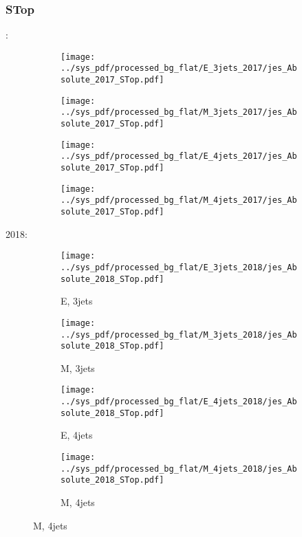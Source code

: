 \documentclass{beamer}
\begin{document}
\begin{frame}
\frametitle{STop}
\fontsize{5}{1}:
\begin{figure}
\centering
\begin{subfigure}[b]{0.24\textwidth}
\texttt{[image: ../sys\_pdf/processed\_bg\_flat/E\_3jets\_2017/jes\_Absolute\_2017\_STop.pdf]}
\end{subfigure}
\begin{subfigure}[b]{0.24\textwidth}
\texttt{[image: ../sys\_pdf/processed\_bg\_flat/M\_3jets\_2017/jes\_Absolute\_2017\_STop.pdf]}
\end{subfigure}
\begin{subfigure}[b]{0.24\textwidth}
\texttt{[image: ../sys\_pdf/processed\_bg\_flat/E\_4jets\_2017/jes\_Absolute\_2017\_STop.pdf]}
\end{subfigure}
\begin{subfigure}[b]{0.24\textwidth}
\texttt{[image: ../sys\_pdf/processed\_bg\_flat/M\_4jets\_2017/jes\_Absolute\_2017\_STop.pdf]}
\end{subfigure}
\end{figure}
2018:
\begin{figure}
\centering
\begin{subfigure}[b]{0.24\textwidth}
\texttt{[image: ../sys\_pdf/processed\_bg\_flat/E\_3jets\_2018/jes\_Absolute\_2018\_STop.pdf]}
\captionsetup{font=tiny}
\caption{E, 3jets}
\end{subfigure}
\begin{subfigure}[b]{0.24\textwidth}
\texttt{[image: ../sys\_pdf/processed\_bg\_flat/M\_3jets\_2018/jes\_Absolute\_2018\_STop.pdf]}
\captionsetup{font=tiny}
\caption{M, 3jets}
\end{subfigure}
\begin{subfigure}[b]{0.24\textwidth}
\texttt{[image: ../sys\_pdf/processed\_bg\_flat/E\_4jets\_2018/jes\_Absolute\_2018\_STop.pdf]}
\captionsetup{font=tiny}
\caption{E, 4jets}
\end{subfigure}
\begin{subfigure}[b]{0.24\textwidth}
\texttt{[image: ../sys\_pdf/processed\_bg\_flat/M\_4jets\_2018/jes\_Absolute\_2018\_STop.pdf]}
\captionsetup{font=tiny}
\caption{M, 4jets}
\end{subfigure}
\end{figure}
\end{frame}
\end{document}
